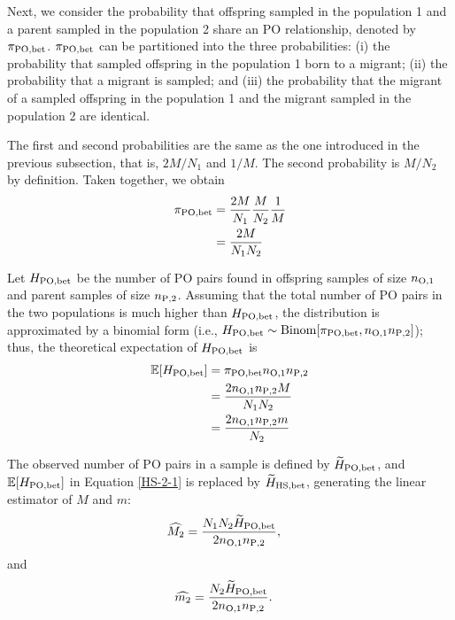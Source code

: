 \documentclass[12pt, English]{article}
\begin{document}
\begin{spacing}{1.9}
Next, we consider the probability that offspring sampled in the population 1 and a parent sampled in the population 2 share an PO relationship, denoted by $\pi_{\rm PO, bet}$. $\pi_{\rm PO, bet}$ can be partitioned into the three probabilities: (i) the probability that sampled offspring in the population 1 born to a migrant; (ii) the probability that a migrant is sampled; and (iii) the probability that the migrant of a sampled offspring in the population 1 and the migrant sampled in the population 2 are identical. 

The first and second probabilities are the same as the one introduced in the previous subsection, that is, $2M/N_{1}$ and $1/M$. The second probability is $M/N_{2}$ by definition. Taken together, we obtain
\begin{align}
\pi_{\rm PO,bet} &= \frac{2M}{N_{1}} \frac{M}{N_{2}} \frac{1}{M} \nonumber\\
&= \frac{2M}{N_{1}N_{2}}
\label{PO-1}
\end{align}

Let $H_{\rm PO,bet}$ be the number of PO pairs found in offspring samples of size $n_{\rm O, 1}$ and parent samples of size $n_{\rm P, 2}$. Assuming that the total number of PO pairs in the two populations is much higher than $H_{\rm PO,bet}$, the distribution is approximated by a binomial form (i.e., $H_{\rm PO,bet} \sim {\rm Binom}[\pi_{\rm PO,bet}, n_{\rm O, 1} n_{\rm P, 2}]$); thus, the theoretical expectation of $H_{\rm PO,bet}$ is
\begin{align}
\mathbb{E}[H_{\rm PO, bet}] &= \pi_{\rm PO,bet} n_{\rm O, 1} n_{\rm P, 2} \nonumber\\
&= \frac{ 2 n_{\rm O, 1} n_{\rm P, 2} M } { N_{1} N_{2} } \label{PO-2-1} \\
&= \frac{ 2 n_{\rm O, 1} n_{\rm P, 2} m } { N_{2} }
\label{PO-2-2}
\end{align}

The observed number of PO pairs in a sample is defined by $\widetilde{H}_{\rm PO, bet}$, and $\mathbb{E}[H_{\rm PO, bet}]$ in Equation \ref{HS-2-1} is replaced by $\widetilde{H}_{\rm HS, bet}$, generating the linear estimator of $M$ and $m$:
\begin{align}
\widehat{M_2} &= \frac{N_{1} N_{2} \widetilde{H}_{\rm PO,bet} } {2 n_{\rm O, 1} n_{\rm P, 2} },
\label{PO-3}
\end{align}
and
\begin{align}
\widehat{m_2} &= \frac{N_{2} \widetilde{H}_{\rm PO,bet} } {2 n_{\rm O, 1} n_{\rm P, 2} }.
\label{PO-4}
\end{align}



\end{spacing}
\end{document}
